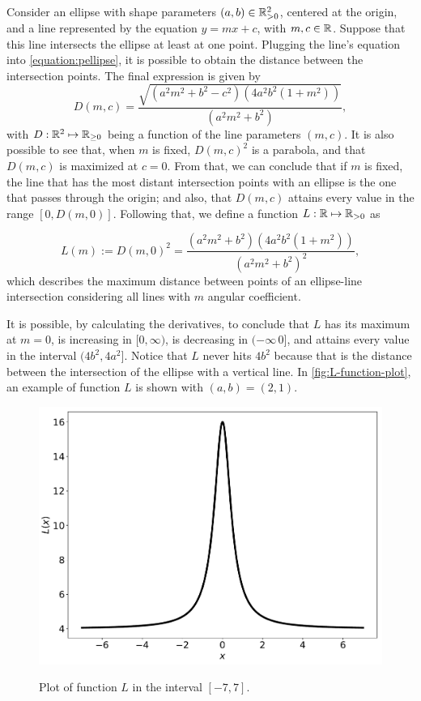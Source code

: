 Consider an ellipse with shape parameters $(a, b)\in\mathbb{R}^2_{>0}$, centered at the origin, and a line represented by the equation $y=mx+c$, with $m, c\in \mathbb{R}$. Suppose that this line intersects the ellipse at least at one point. Plugging the line's equation into \autoref{equation:pellipse}, it is possible to obtain the distance between the intersection points. The final expression is given by
\begin{equation*}\label{eq:dist_line_ellipse}
D(m, c)=\dfrac{\sqrt{(a^2m^2+b^2-c^2)(4a^2b^2(1+m^2))}}{(a^2m^2+b^2)},
\end{equation*}
with $D : \mathbb{R}^2 \mapsto \mathbb{R}_{\ge0}$ being a function of the line parameters $(m, c)$. It is also possible to see that, when $m$ is fixed, $D(m, c)^2$ is a parabola, and that $D(m, c)$ is maximized at $c=0$. From that, we can conclude that if $m$ is fixed, the line that has the most distant intersection points with an ellipse is the one that passes through the origin; and also, that $D(m, c)$ attains every value in the range $[0, D(m, 0)]$. 
Following that, we define a function $L:\mathbb{R}\mapsto\mathbb{R}_{>0}$ as

\begin{equation}\label{eq:function-l}
L(m):= D(m, 0)^2 = \dfrac{(a^2m^2+b^2)(4a^2b^2(1+m^2))}{(a^2m^2+b^2)^2},
\end{equation}
which describes the maximum distance between points of an ellipse-line intersection considering all lines with $m$ angular coefficient.

It is possible, by calculating the derivatives, to conclude that $L$ has its maximum at $m=0$, is increasing in $[0, \infty)$, is decreasing in $(-\infty\, 0]$, and attains every value in the interval $(4b^2, 4a^2]$. Notice that $L$ never hits $4b^2$ because that is the distance between the intersection of the ellipse with a vertical line.
In \autoref{fig:L-function-plot}, an example of function $L$ is shown with $(a, b) = (2, 1)$.

\begin{figure}[H]
	\centering
	
	\caption{Plot of function $L$ in the interval $[-7, 7]$.}
	\includegraphics[scale=.4]{tex/figures/L-function-plot}
	\fautor
	\label{fig:L-function-plot}
\end{figure}

